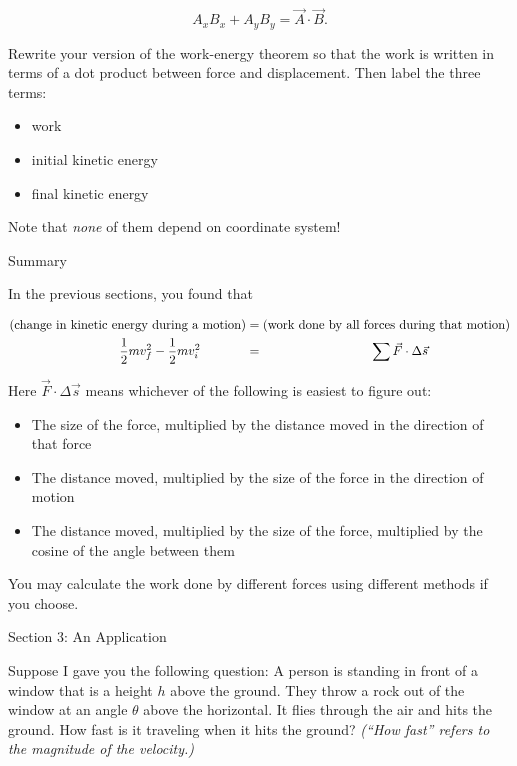 \documentclass[12pt]{article}
\begin{document}
\begin{enumerate}
$$A_x B_x + A_y B_y = \vec A \cdot \vec B.$$

Rewrite your version of the work-energy theorem so that the work is written in terms of a dot product between force and displacement. Then label the three terms:

\begin{itemize}
\item work
\item initial kinetic energy
\item final kinetic energy
\end{itemize}

Note that {\it none} of them depend on coordinate system!

\end{enumerate}

\newpage

{\Large Summary}

In the previous sections, you found that

\begin{align*}
\text{(change in kinetic energy during a motion)} &= \text {(work done by all forces during that motion)} \\
\frac{1}{2}mv_f^2 - \frac{1}{2}mv_i^2 \hspace{0.5in} &= \hspace{1.2in}\sum \vec F \cdot \Delta \vec s
\end{align*}

Here $\vec F \cdot \Delta \vec s$ means whichever of the following is easiest to figure out:

\begin{itemize}
\item The size of the force, multiplied by the distance moved in the direction of that force
\item The distance moved, multiplied by the size of the force in the direction of motion
\item The distance moved, multiplied by the size of the force, multiplied by the cosine of the angle between them
\end{itemize}

You may calculate the work done by different forces using different methods if you choose.
\newpage

{\Large Section 3: An Application}

Suppose I gave you the following question: A person is standing in front of a window that is a height $h$ above the ground. They throw a rock out of the window at an angle $\theta$ above the horizontal. It flies through the air and hits the ground. How fast is it traveling when it hits the ground? {\it (``How fast'' refers to the magnitude of the velocity.)}
\end{document}

